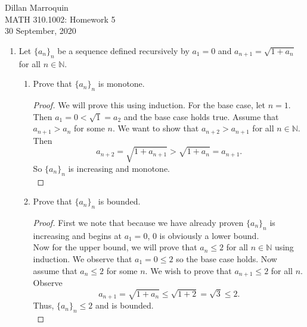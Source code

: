 \documentclass{article}
\begin{document}
    \noindent Dillan Marroquin\\
    MATH 310.1002: Homework 5\\
    30 September, 2020

    \begin{enumerate}
        \item Let $\{a_n\}_n$ be a sequence defined recursively by $a_1 = 0$ and $a_{n+1} = \sqrt{1+a_n}$ for all $n \in \mathbb{N}$.
            \begin{enumerate}
                \item Prove that $\{a_n\}_n$ is monotone.
                    \begin{proof}
                        We will prove this using induction. For the base case, let $n = 1$. Then $a_1 = 0 < \sqrt{1} = a_2$ and the base case holds true.  Assume that $a_{n+1} > a_n$ for some $n$. We want to show that $a_{n+2} > a_{n+1}$ for all $n \in \mathbb{N}$. Then
                            \[a_{n+2} = \sqrt{1+a_{n+1}} > \sqrt{1+a_n} = a_{n+1}.\]
                        So $\{a_n\}_n$ is increasing and monotone.\\
                    \end{proof}
            
                \item Prove that $\{a_n\}_n$ is bounded.
                    \begin{proof}
                        First we note that because we have already proven $\{a_n\}_n$ is increasing and begins at $a_1 = 0$, $0$ is obviously a lower bound.
                        \\Now for the upper bound, we will prove that $a_n \leq 2$ for all $n \in \mathbb{N}$ using induction. We observe that $a_1=0 \leq 2$ so the base case holds. Now assume that $a_n \leq 2$ for some $n$. We wish to prove that $a_{n+1} \leq 2$ for all $n$. Observe
                            \[a_{n+1} = \sqrt{1+a_n} \leq \sqrt{1+2} = \sqrt{3} \leq 2.\]
                    Thus, $\{a_n\}_n \leq 2$ and is bounded.\\
                    \end{proof}
                

\end{enumerate}
\end{enumerate}
\end{document}
